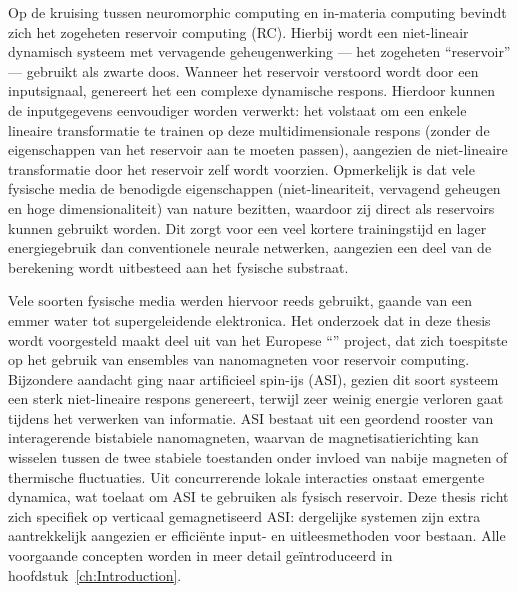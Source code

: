 Op de kruising tussen neuromorphic computing en in-materia computing bevindt zich het zogeheten reservoir computing (RC).
Hierbij wordt een niet-lineair dynamisch systeem met vervagende geheugenwerking --- het zogeheten ``reservoir'' --- gebruikt als zwarte doos.
Wanneer het reservoir verstoord wordt door een inputsignaal, genereert het een complexe dynamische respons.
Hierdoor kunnen de inputgegevens eenvoudiger worden verwerkt: het volstaat om een enkele lineaire transformatie te trainen op deze multidimensionale respons (zonder de eigenschappen van het reservoir aan te moeten passen), aangezien de niet-lineaire transformatie door het reservoir zelf wordt voorzien. 
Opmerkelijk is dat vele fysische media de benodigde eigenschappen (niet-lineariteit, vervagend geheugen en hoge dimensionaliteit) van nature bezitten, waardoor zij direct als reservoirs kunnen gebruikt worden.
Dit zorgt voor een veel kortere trainingstijd en lager energiegebruik dan conventionele neurale netwerken, aangezien een deel van de berekening wordt uitbesteed aan het fysische substraat. \par
Vele soorten fysische media werden hiervoor reeds gebruikt, gaande van een emmer water tot supergeleidende elektronica.
Het onderzoek dat in deze thesis wordt voorgesteld maakt deel uit van het Europese ``\spinengine'' project, dat zich toespitste op het gebruik van ensembles van nanomagneten voor reservoir computing.
Bijzondere aandacht ging naar artificieel spin-ijs (ASI), gezien dit soort systeem een sterk niet-lineaire respons genereert, terwijl zeer weinig energie verloren gaat tijdens het verwerken van informatie.
ASI bestaat uit een geordend rooster van interagerende bistabiele nanomagneten, waarvan de magnetisatierichting kan wisselen tussen de twee stabiele toestanden onder invloed van nabije magneten of thermische fluctuaties.
Uit concurrerende lokale interacties onstaat emergente dynamica, wat toelaat om ASI te gebruiken als fysisch reservoir.
Deze thesis richt zich specifiek op verticaal gemagnetiseerd ASI: dergelijke systemen zijn extra aantrekkelijk aangezien er effici\"ente input- en uitleesmethoden voor bestaan.
Alle voorgaande concepten worden in meer detail ge\"introduceerd in hoofdstuk~\ref{ch:Introduction}. \\

